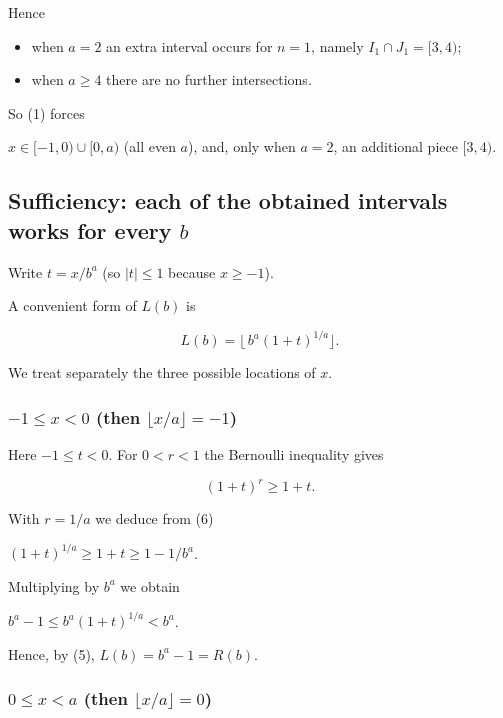 \documentclass[12pt,a4paper]{article}
\theoremstyle{definition}
\begin{document}
        Hence

        \begin{itemize}
            \item when $a = 2$ an extra interval occurs for $n = 1$, namely
            $I_1\cap J_1 = [3,4)$;

            \item when $a \geq 4$ there are no further intersections.
        \end{itemize}

        So (1) forces

        $x \in [-1,0) \cup [0,a)$ (all even $a$),
        and, only when $a=2$, an additional piece $[3,4)$.

        \subsection*{Sufficiency: each of the obtained intervals works for every $b$}

        Write $t = x/b^{a}$ (so $|t| \leq 1$ because $x \geq -1$).

        A convenient form of $L(b)$ is

        \begin{equation}
            L(b)=\lfloor\,b^{a}(1+t)^{1/a}\rfloor.
        \end{equation}

        We treat separately the three possible locations of $x$.

        \subsubsection*{$-1 \leq x < 0$ (then $\lfloor x/a\rfloor = -1$)}

        Here $-1 \leq t < 0$. For $0<r<1$ the Bernoulli inequality gives

        \begin{equation}
        (1+t)^{r} \geq 1+t.
        \end{equation}

        With $r = 1/a$ we deduce from (6)

        $(1+t)^{1/a} \geq 1 + t \geq 1 - 1/b^{a}$.

        Multiplying by $b^{a}$ we obtain

        $b^{a} - 1 \leq b^{a}(1+t)^{1/a} < b^{a}$.

        Hence, by (5), $L(b)=b^{a}-1 = R(b)$.

        \subsubsection*{$0 \leq x < a$ (then $\lfloor x/a\rfloor = 0$)}
\end{document}
